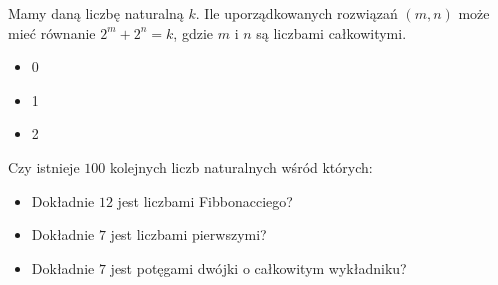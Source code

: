 \documentclass[12pt, a4paper]{article}
\newcommand{\question}[1]{\normalitem \begin{samepage}#1 \end{samepage}}
\begin{document}
\begin{enumerate}
	\question{
	    Mamy daną liczbę naturalną $k$. Ile uporządkowanych rozwiązań $(m,n)$ może mieć równanie $2^m+2^n=k$, gdzie $m$ i $n$ są liczbami całkowitymi.
	    
	    \begin{itemize}
	        \item 0
	        \item 1
	        \item 2
	    \end{itemize}
	}
	
	\question {
		Czy istnieje $100$ kolejnych liczb naturalnych wśród których:
		
		\begin{itemize}
			\item Dokładnie $12$ jest liczbami Fibbonacciego?
			\item Dokładnie $7$ jest liczbami pierwszymi?
			\item Dokładnie $7$ jest potęgami dwójki o całkowitym wykładniku?
		\end{itemize}
		
	}
	
\end{enumerate}
\end{document}
